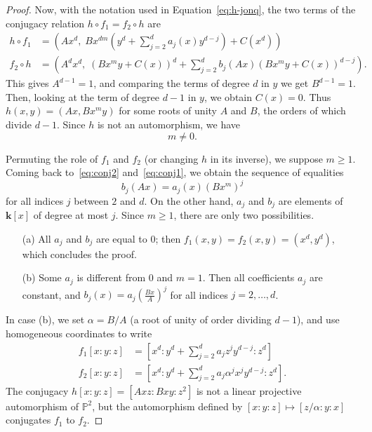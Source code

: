\documentclass[reqno,oneside,12pt]{amsart}
\theoremstyle{plain}
\theoremstyle{definition}
\def\bfk{{\mathbf{k}}}
\newcommand{\bbA}{{\mathbb{A}}}
\def\P{\mathbb{P}}
\begin{document}
{{{{\begin{proof}
Now, with the notation used in Equation~\eqref{eq:h-jonq}, the two terms of the conjugacy relation $h\circ f_1=f_2\circ h$ are
\begin{align}
h\circ f_1 &=(Ax^d, \; Bx^{dm}(y^d+\sum_{j=2}^da_j(x)y^{d-j})+C(x^d) )\label{eq:conj2}\\
f_2\circ h &=(A^d x^d, \; (Bx^my+C(x))^d+\sum_{j=2}^db_j(Ax) (Bx^my+C(x))^{d-j} ) \label{eq:conj1}.
\end{align}
This gives $A^{d-1}=1$, and comparing the terms of degree $d$ in $y$ we get %
$B^{d-1}=1$. 
Then, looking at the term of degree $d-1$ in $y$, 
we obtain $C(x)=0.$
Thus $h(x,y)=(Ax, Bx^m y)$ for some roots of unity $A$ and $B$, the orders of which divide $d-1$. 
Since $h$ is not an automorphism, we have 
\begin{equation}\label{eq:mneq0}
m\neq 0.
\end{equation}


Permuting the role of $f_1$ and $f_2$ (or changing $h$ in its inverse), we suppose $m\geq 1$.
Coming back to~\eqref{eq:conj2} and~\eqref{eq:conj1}, we obtain the sequence of equalities 
\begin{equation}
b_j(Ax) = a_j(x) (Bx^m)^j 
\end{equation}
for all indices $j$ between $2$ and $d$. On the other hand, $a_j$ and $b_j$ are elements of $\bfk[x]$ of degree at most $j$. Since $m\geq 1$, there are only two possibilities.
\begin{enumerate}
\item[(a)] All $a_j$ and $b_j$ are equal to $0$; then  $f_1(x,y)=f_2(x,y)=(x^d, y^d)$, which concludes the proof.
\item[(b)] Some $a_j$ is different from $0$ and $m=1$. Then all coefficients $a_j$ are constant, and $b_j(x)=a_j \left(\frac{Bx}{A}\right)^j$
for all indices $j=2, \ldots, d$.
\end{enumerate}
In case (b), we set $\alpha=B/A$ (a root of unity of order dividing $d-1$),  and use homogeneous coordinates to write
\begin{align}
f_1[x:y:z] &=[x^d : y^d +\sum_{j=2}^d a_j z^{j} y^{d-j}: z^d] \\ 
f_2[x:y:z] &=[x^d : y^d +\sum_{j=2}^d a_j \alpha^j x^{j} y^{d-j}: z^d].
\end{align}
The conjugacy $h[x:y:z]=[Axz : Bxy : z^2]$ is not a linear projective automorphism of $\P^2$, but
the automorphism defined by 
$[x:y:z]\mapsto \left[ z/\alpha:y:x \right]$ conjugates $f_1$ to $f_2$. 


\end{proof}}}}}
\end{document}
